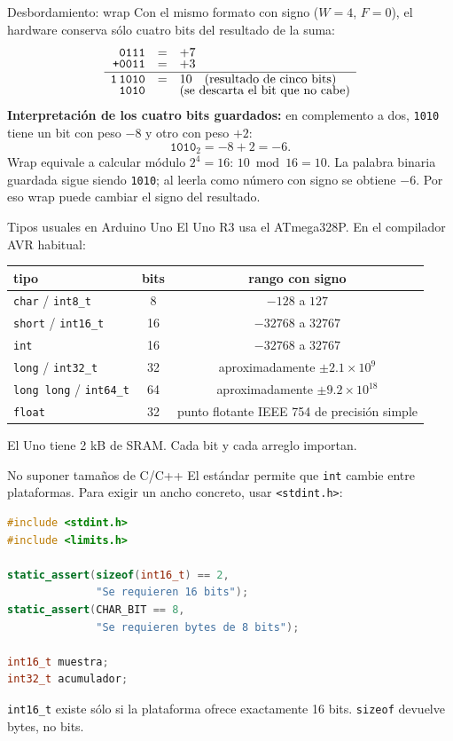 \documentclass[aspectratio=169,10pt]{beamer}
\begin{document}
\begin{frame}{Desbordamiento: wrap}
  Con el mismo formato con signo ($W=4$, $F=0$), el hardware conserva sólo
  cuatro bits del resultado de la suma:
  \[
    \begin{array}{rcl}
      \texttt{0111} & = & +7\\[-1mm]
      \texttt{+0011} & = & +3\\ \hline
      \texttt{1\,1010} & = & 10\quad\text{(resultado de cinco bits)}\\[-1mm]
      \texttt{1010} & & \text{(se descarta el bit que no cabe)}
    \end{array}
  \]
  \textbf{Interpretación de los cuatro bits guardados:} en complemento a dos,
  \texttt{1010} tiene un bit con peso $-8$ y otro con peso $+2$:
  \[
    \texttt{1010}_2=-8+2=-6.
  \]
  Wrap equivale a calcular módulo $2^4=16$: $10\bmod16=10$. La palabra binaria
  guardada sigue siendo \texttt{1010}; al leerla como número con signo se obtiene
  $-6$. Por eso wrap puede cambiar el signo del resultado.
\end{frame}

\begin{frame}{Tipos usuales en Arduino Uno}
  El Uno R3 usa el ATmega328P. En el compilador AVR habitual:
  \begin{center}
  \begin{tabular}{lcc}
  \toprule
  tipo & bits & rango con signo\\ \midrule
  \texttt{char} / \texttt{int8\_t} & 8 & $-128$ a $127$\\
  \texttt{short} / \texttt{int16\_t} & 16 & $-32768$ a $32767$\\
  \texttt{int} & 16 & $-32768$ a $32767$\\
  \texttt{long} / \texttt{int32\_t} & 32 & aproximadamente $\pm2.1\times10^9$\\
  \texttt{long long} / \texttt{int64\_t} & 64 & aproximadamente $\pm9.2\times10^{18}$\\
  \texttt{float} & 32 & punto flotante IEEE 754 de precisión simple\\
  \bottomrule
  \end{tabular}
  \end{center}
  El Uno tiene 2 kB de SRAM. Cada bit y cada arreglo importan.
\end{frame}

\begin{frame}[fragile]{No suponer tamaños de C/C++}
  El estándar permite que \texttt{int} cambie entre plataformas. Para exigir un
  ancho concreto, usar \texttt{<stdint.h>}:
  \begin{lstlisting}[language=C++]
#include <stdint.h>
#include <limits.h>

static_assert(sizeof(int16_t) == 2,
              "Se requieren 16 bits");
static_assert(CHAR_BIT == 8,
              "Se requieren bytes de 8 bits");

int16_t muestra;
int32_t acumulador;
  \end{lstlisting}
  \texttt{int16\_t} existe sólo si la plataforma ofrece exactamente 16 bits.
  \texttt{sizeof} devuelve bytes, no bits.
\end{frame}
\end{document}

